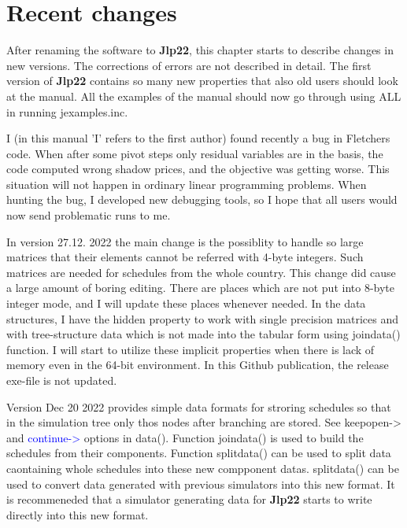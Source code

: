 \section{Recent changes} 
\label{changes} 
 
After renaming the software to \textbf{Jlp22}, this chapter starts to describe changes in new versions. 
The corrections of errors are not described in detail. The first version of \textbf{Jlp22} contains so many new properties that also old users 
should look at the manual. All the examples of the manual should now go through using ALL in running 
jexamples.inc. 
 
I (in this manual 'I' refers to the first author) found recently a bug in Fletchers code. When after some pivot steps only residual variables 
are in the basis, the code computed wrong shadow prices, and the objective was getting worse. 
This situation will not happen in ordinary linear programming problems. When hunting the bug, I developed new 
debugging tools, so I hope that all users would now send problematic 
runs to me. 
 
In version 27.12. 2022 the main change is the possiblity to handle so large matrices that their 
elements cannot be referred with 4-byte integers. Such matrices are needed for schedules from the whole 
country. This change did cause a large amount of boring editing. 
There are places which are not put into 8-byte integer mode, and I will update 
these places whenever needed. 
In the data structures, I have the hidden property to work with single precision matrices and with tree-structure 
data which is not made into the tabular form using \textcolor{VioletRed}{joindata}() function. I will start to 
utilize these implicit properties when there is lack of memory even in the 64-bit environment. 
In this Github publication, 
the release exe-file is not updated. 
 
Version Dec 20 2022 provides simple data formats for stroring schedules so that in the simulation tree only thos 
nodes after branching are stored. See keepopen-> and \textcolor{blue}{continue->} options in \textcolor{VioletRed}{data}(). Function \textcolor{VioletRed}{joindata}() is 
used to build the schedules from their components. Function \textcolor{VioletRed}{splitdata}() can be used to split data caontaining whole 
schedules into these new compponent datas. \textcolor{VioletRed}{splitdata}() can be used to convert data generated with previous simulators 
into this new format. It is recommeneded that a simulator generating data for \textbf{Jlp22} 
starts to write directly into this new format. 
 
